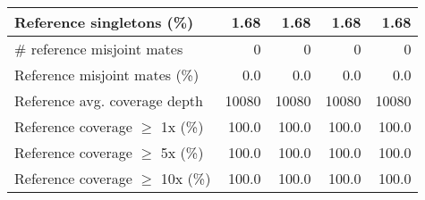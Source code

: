\documentclass[12pt,a4paper]{article}
\begin{document}
\begin{table}[ht]
\begin{center}
\begin{tabular}{|l*{4}{|r}|}
Reference singletons (\%) & 1.68 & 1.68 & 1.68 & 1.68 \\ \hline
\# reference misjoint mates & 0 & 0 & 0 & 0 \\ \hline
Reference misjoint mates (\%) & 0.0 & 0.0 & 0.0 & 0.0 \\ \hline
Reference avg. coverage depth & 10080 & 10080 & 10080 & 10080 \\ \hline
Reference coverage $\geq$ 1x (\%) & 100.0 & 100.0 & 100.0 & 100.0 \\ \hline
Reference coverage $\geq$ 5x (\%) & 100.0 & 100.0 & 100.0 & 100.0 \\ \hline
Reference coverage $\geq$ 10x (\%) & 100.0 & 100.0 & 100.0 & 100.0 \\ \hline
\end{tabular}
\end{center}
\end{table}
\end{document}
